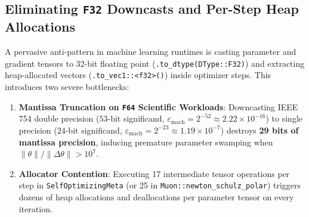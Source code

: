 \documentclass[10pt,twocolumn,letterpaper]{article}
\theoremstyle{definition}
\theoremstyle{remark}
\newcommand{\epsmach}{\varepsilon_{\mathrm{mach}}}
\begin{document}
\subsection{Eliminating \texttt{F32} Downcasts and Per-Step Heap Allocations}

A pervasive anti-pattern in machine learning runtimes is casting parameter and gradient tensors to 32-bit floating point (\texttt{.to\_dtype(DType::F32)}) and extracting heap-allocated vectors (\texttt{.to\_vec1::<f32>()}) inside optimizer steps. This introduces two severe bottlenecks:
\begin{enumerate}[leftmargin=*,nosep]
  \item \textbf{Mantissa Truncation on \texttt{F64} Scientific Workloads}: Downcasting IEEE 754 double precision ($53\text{-bit}$ significand, $\epsmach = 2^{-52} \approx 2.22 \times 10^{-16}$) to single precision ($24\text{-bit}$ significand, $\epsmach = 2^{-23} \approx 1.19 \times 10^{-7}$) destroys \textbf{29 bits of mantissa precision}, inducing premature parameter swamping when $\|\theta\| / \|\Delta\theta\| > 10^7$.
  \item \textbf{Allocator Contention}: Executing 17 intermediate tensor operations per step in \texttt{SelfOptimizingMeta} (or 25 in \texttt{Muon::newton\_schulz\_polar}) triggers dozens of heap allocations and deallocations per parameter tensor on every iteration.
\end{enumerate}
\end{document}

